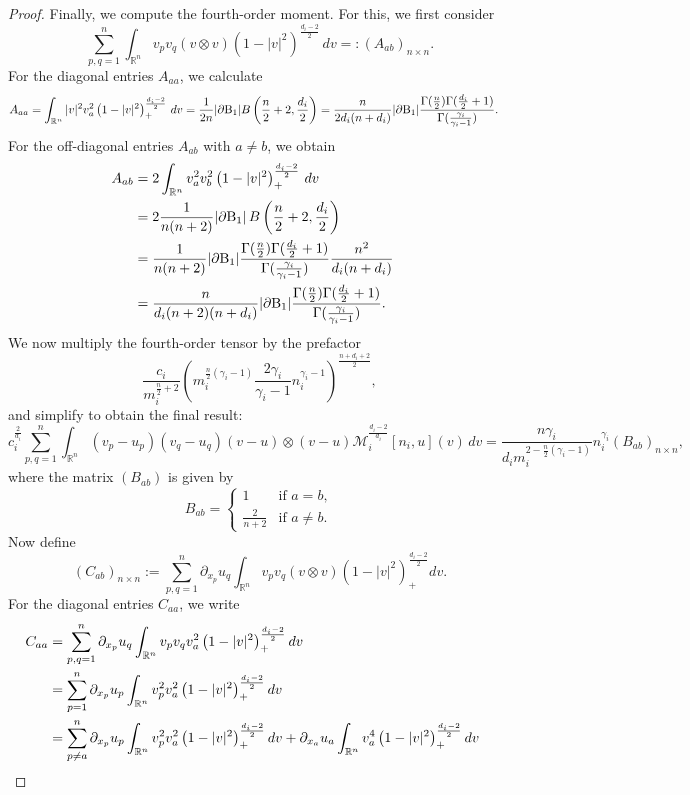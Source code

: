 \documentclass[10pt,reqno]{amsart}
\numberwithin{equation}{section}
\newcommand{\R}{\mathbb R}
\newcommand{\pa}{\partial}
\newcommand{\intr}{\int_{\R^n}}
\begin{document}
\begin{proof}
 Finally, we compute the fourth-order moment. For this, we first consider
\[
\sum_{p,q=1}^n \int_{\mathbb{R}^n} v_p v_q (v \otimes v) (1 - |v|^2)^{\frac{d_i - 2}{2}}\, dv =: (A_{ab})_{n \times n}.
\]
For the diagonal entries $A_{aa}$, we calculate
\begin{align*}
A_{aa}&=\intr |v|^2 v_a^2   \left(1-|v|^2\right)^{\frac{d_i-2}{2}}_+\,dv   =\frac {1}{2n}|\pa {\rm B}_1|B\left(\frac{n}{2}+2,\frac {d_i}2 \right) =\frac{n}{2d_i(n+d_i)}|\pa {\rm B}_1|\frac{\Gamma(\frac n2)\Gamma(\frac {d_i}{2}+1)}{\Gamma(\frac{\gamma_i}{\gamma_i-1})}.
\end{align*}
For the off-diagonal entries $A_{ab}$ with $a \ne b$, we obtain
\begin{align}\label{ab}\begin{split}
A_{ab}&=2\intr v_a^2 v_b^2   \left(1-|v|^2\right)^{\frac{d_i-2}{2}}_+\,dv\cr 
&=2  \frac{1}{n(n+2)} |\partial \mathrm{B}_1| \, B\left(\frac{n}{2}+2, \frac{d_i}2 \right)\cr 
&=\frac{1}{n(n+2)}|\pa {\rm B}_1|\frac{\Gamma(\frac n2)\Gamma(\frac {d_i}{2}+1)}{\Gamma(\frac{\gamma_i}{\gamma_i-1})}\frac{n^2}{d_i(n+d_i)}\cr 
&=\frac{n}{d_i(n+2)(n+d_i)}|\pa {\rm B}_1|\frac{\Gamma(\frac n2)\Gamma(\frac {d_i}{2}+1)}{\Gamma(\frac{\gamma_i}{\gamma_i-1})}.
\end{split}\end{align}
We now multiply the fourth-order tensor by the prefactor
\[
\frac{c_i}{m_i^{\frac{n}{2} + 2}} \left( m_i^{\frac{n}{2}(\gamma_i - 1)} \frac{2\gamma_i}{\gamma_i - 1} n_i^{\gamma_i - 1} \right)^{\frac{n + d_i + 2}{2}},
\]
and simplify to obtain the final result:
\[
c_i^{\frac{2}{d_i}} \sum_{p,q=1}^n \int_{\mathbb{R}^n} (v_p - u_p)(v_q - u_q)(v - u) \otimes (v - u) \mathcal{M}_i^{\frac{d_i - 2}{d_i}}[n_i, u](v)\, dv = \frac{n \gamma_i}{d_i m_i^{2 - \frac{n}{2}(\gamma_i - 1)}} n_i^{\gamma_i} (B_{ab})_{n \times n},
\]
where the matrix $(B_{ab})$ is given by
\[
B_{ab} = \begin{cases}
1 & \text{if } a = b, \\
\frac{2}{n + 2} & \text{if } a \ne b.
\end{cases}
\]
Now define
$$
(C_{ab})_{n \times n}:=\sum_{p,q=1}^n\pa_{x_p}u_q\intr v_p v_q (v\otimes v) \left(1-|v |^2\right)^{\frac{d_i-2}{2}}_+  dv.
$$
For the diagonal entries $C_{aa}$, we write
\begin{align*}
C_{aa}&=\sum_{p,q=1}^n\pa_{x_p}u_q\intr v_p v_q v_a^2 \left(1-|v |^2\right)^{\frac{d_i-2}{2}}_+  dv\cr 
&=\sum_{p=1}^n\pa_{x_p}u_p\intr v_p^2 v_a^2 \left(1-|v |^2\right)^{\frac{d_i-2}{2}}_+  dv\cr 
&=\sum_{p\neq a}^n\pa_{x_p}u_p\intr v_p^2 v_a^2 \left(1-|v |^2\right)^{\frac{d_i-2}{2}}_+  dv+\pa_{x_a}u_a\intr  v_a^4 \left(1-|v |^2\right)^{\frac{d_i-2}{2}}_+  dv\cr 

\end{align*}
\end{proof}
\end{document}
